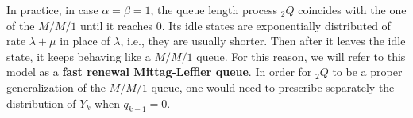 \documentclass[]{amsart}
\numberwithin{equation}{section}
\theoremstyle{remark}
\theoremstyle{definition}
\DeclareMathOperator{\bP}{\mathbb{P}}
\begin{document}
{In practice, in case $\alpha=\beta=1$, the queue length process ${}_2Q$ coincides with the one of the $M/M/1$ until it reaches $0$. Its idle states are exponentially distributed of rate $\lambda+\mu$ in place of $\lambda$, i.e., they are usually shorter. Then after it leaves the idle state, it keeps behaving like a $M/M/1$ queue. For this reason, we will refer to this model as a \textbf{fast renewal Mittag-Leffler queue}. In order for ${}_2Q$ to be a proper generalization of the $M/M/1$ queue, one would need to prescribe separately the distribution of $Y_k$ when $q_{k-1}=0$.}
\end{document}

